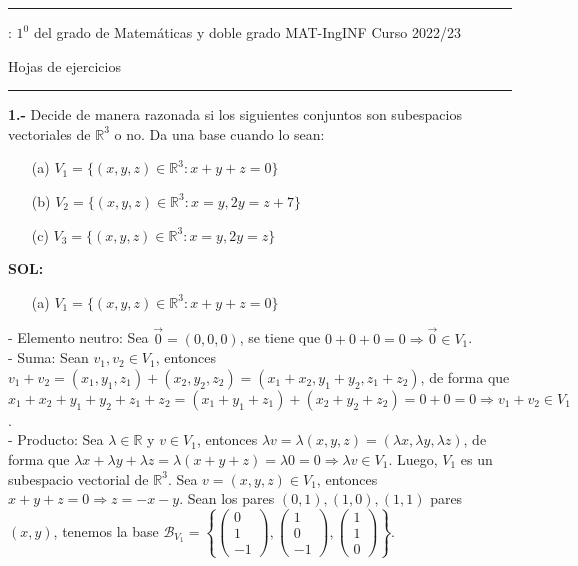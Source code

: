 \documentclass[11pt,a4paper]{article}
\date{ }
\newcommand{\R}{\mathbb R}
\begin{document}
\hrule \vskip 1mm

:   $1^0$ del grado de  Matem\'aticas y doble grado MAT-IngINF \hfill  Curso 2022/23


\vskip 1mm

{\centering Hojas de ejercicios\par}
\vskip 1mm \hrule \vskip 5mm
{\bf 1.-} Decide de manera razonada si los siguientes conjuntos son subespacios vectoriales de $\R^3$ o no. Da una base cuando lo sean:
\begin{itemize}
\item[(a)] $V_1=\{(x,y,z)\in\R^3:x+y+z=0\}$
\item[(b)] $V_2=\{(x,y,z)\in\R^3:x=y, 2y=z+7\}$
\item[(c)] $V_3=\{(x,y,z)\in\R^3:x=y,2y=z\}$
\end{itemize}
\vskip 1mm
{\bf SOL:}
\begin{itemize}\item[(a)]$V_1=\{(x,y,z)\in\R^3:x+y+z=0\}$\end{itemize}

- Elemento neutro: Sea $\vec 0=(0,0,0)$, se tiene que $0+0+0=0\Rightarrow \vec 0\in V_1$.\\
- Suma: Sean $v_1,v_2\in V_1$, entonces $v_1+v_2=(x_1,y_1,z_1)+(x_2,y_2,z_2)=(x_1+x_2,y_1+y_2,z_1+z_2)$, de forma que $x_1+x_2+y_1+y_2+z_1+z_2=(x_1+y_1+z_1)+(x_2+y_2+z_2)=0+0=0\Rightarrow v_1+v_2\in V_1$.\\
- Producto: Sea $\lambda\in\R$ y $v\in V_1$, entonces $\lambda v=\lambda(x,y,z)=(\lambda x,\lambda y,\lambda z)$, de forma que $\lambda x+\lambda y+\lambda z=\lambda(x+y+z)=\lambda 0=0\Rightarrow \lambda v\in V_1$.
\vskip 0.5mm
Luego, $V_1$ es un subespacio vectorial de $\R^3$.
\vskip 1mm
Sea $v=(x,y,z)\in V_1$, entonces $x+y+z=0\Rightarrow z=-x-y$. Sean los pares $(0,1), (1,0), (1,1)$ pares $(x,y)$, tenemos la base $\mathcal B_{V_1}=\left\{\begin{pmatrix}0\\1\\-1\end{pmatrix},\begin{pmatrix}1\\0\\-1\end{pmatrix},\begin{pmatrix}1\\1\\0\end{pmatrix}\right\}$.\\
\end{document}
